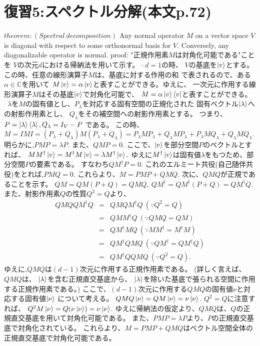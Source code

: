 \section{\Large 復習5:スペクトル分解(本文p.72)}
$theorem :(Spectral~decomposition)$
Any normal operator $M$ on a vector space $V$ is
diagonal with respect to some orthonormal basis for $V$.
Conversely, any diagonalizable operator is normal.
\newline
{\large proof:}
"正規作用素$M$は対角化可能である"ことを
$V$の次元$d$における帰納法を用いて示す。
\newline
$\cdot ~d = 1$の時、
$V$の基底を$\ket{v}$とする。この時、任意の線形演算子$M$は、基底に対する作用の和
で表されるので、ある$\alpha \in \mathbb{C}$を用いて
$M\ket{v} = \alpha \ket{v}$と表すことができる。ゆえに、
一次元に作用する線形演算子$M$はその基底$\ket{v}$で対角化可能で、
$M = \alpha \ket{v}\bra{v}$と表すことができる。
\newline
~$\lambda$を$M$の固有値とし、$P_\lambda$を対応する固有空間の正規化された
固有ベクトル$\ket{\lambda}$への射影作用素とし、
$Q_\lambda$をその補空間への射影作用素とする。
つまり、$P = \ket{\lambda} \bra{\lambda}, Q_\lambda = I_V - P$
である。
この時、$M = IMI = 
(P_\lambda  + Q_\lambda) M (P_\lambda + Q_\lambda) 
= P_\lambda MP_\lambda + Q_\lambda M P_\lambda + P_\lambda M Q_\lambda 
+ Q_\lambda M Q_\lambda .$
明らかに,$PMP = \lambda P$. また、$QMP = 0.$
ここで、$\ket{v}$を部分空間$P$のベクトルとすれば、
$MM^\dagger \ket{v} = M^\dagger M \ket{v} = \lambda M^\dagger \ket{v}.$
ゆえに$M^\dagger \ket{v}$は固有値$\lambda$をもつため、部分空間$P$の要素である。
すなわち$QM^\dagger P = 0.$
これのエルミート共役(自己随伴共役)をとれば,$PMQ = 0.$
これらより、$M = PMP + QMQ.$
\newline
次に、$QMQ$が正規であることを示す。
$QM = QM(P + Q) = QMQ,~ QM^\dagger = QM^\dagger (P + Q) = QM^\dagger Q.$
また、射影作用素$Q$の性質$Q^2 = Q$より、
\begin{eqnarray*}
QMQQM^\dagger Q &=& QMQM^\dagger Q~(\because Q^2 = Q)\\
&=& QMM^\dagger Q~(\because QMQ = QM)\\
&=&QM^\dagger M Q~(\because MM^\dagger = M^\dagger M)\\
&=& QM^\dagger QMQ~(\because QM^\dagger = QM^\dagger Q)\\
&=& QM^\dagger QQMQ~(\because Q^2 = Q).
\end{eqnarray*}
ゆえに,$QMQ$は$(d - 1)$次元に作用する正規作用素である。
(詳しく言えば、$QMQ$は、
$\ket{\lambda}$を含む正規直交基底から、
$\ket{\lambda}$を除いた基底で張られる空間に作用する正規作用素である。)
\newline
ここで、$(d - 1)$次元に作用する$QMQ$の固有値$\nu$と対応する固有値$\ket{\nu}$
について考える。
$QMQ\ket{\nu} = QM\ket{\nu} = \nu \ket{\nu}$.
$Q^2 = Q$に注意すれば、
$Q^2 M \ket{\nu} = Q (\nu \ket{\nu}) = \nu \ket{\nu}$.
ゆえに帰納法の仮定より、$QMQ$は、$Q$の正規直交基底を用いて対角化可能である。
また、$PMP = \lambda P$より、$P$の正規直交基底で対角化されている。
これらより、$M = PMP + QMQ$はベクトル空間全体の正規直交基底で対角化可能である。

